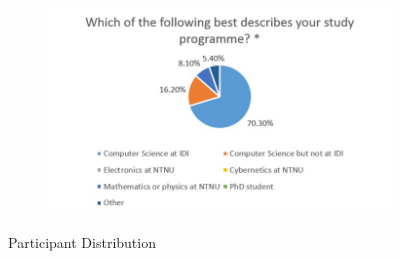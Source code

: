 \begin{figure}
\begin{subfigure}[h]{0.4\textwidth}
        \includegraphics[width=1.5\textwidth, height=1.0\textwidth]{oldresults/distribution.jpg}
        \caption{}
        \label{fig:participants}
    \end{subfigure}
    \caption*{Participant Distribution}
    \label{fig:oldsurvey-dist}
\end{figure}
